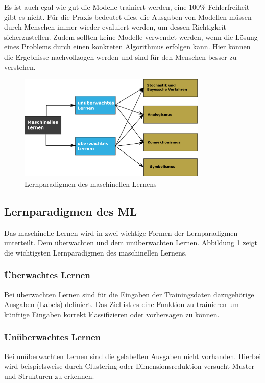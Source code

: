 Es ist auch egal wie gut die Modelle trainiert werden, eine 100\% Fehlerfreiheit gibt es nicht. Für die Praxis bedeutet dies, die Ausgaben von Modellen müssen durch Menschen immer wieder evaluiert werden, um dessen Richtigkeit sicherzustellen. Zudem sollten keine Modelle verwendet werden, wenn die Lösung eines Problems durch einen konkreten Algorithmus erfolgen kann. Hier können die Ergebnisse nachvollzogen werden und sind für den Menschen besser zu verstehen.\vspace{0.2cm}

\begin{figure}[!ht]
	\includegraphics[width=0.8\textwidth]{content/chapter_basics/images/learning_paradigmen_ml_v2.eps}
	\centering
	\caption{Lernparadigmen des maschinellen Lernens}
	\label{img:learning_paradigms_of_ml}
\end{figure}


\subsection{Lernparadigmen des ML}
Das maschinelle Lernen wird in zwei wichtige Formen der Lernparadigmen unterteilt. Dem überwachten und dem unüberwachten Lernen. Abbildung \ref{img:learning_paradigms_of_ml} zeigt die wichtigsten Lernparadigmen des maschinellen Lernens.

\subsubsection{Überwachtes Lernen}
Bei überwachten Lernen sind für die Eingaben der Trainingsdaten dazugehörige Ausgaben (Labels) definiert. Das Ziel ist es eine Funktion zu trainieren um künftige Eingaben korrekt klassifizieren oder vorhersagen zu können.

\subsubsection{Unüberwachtes Lernen}
Bei unüberwachten Lernen sind die gelabelten Ausgaben nicht vorhanden. Hierbei wird beispielsweise durch Clustering oder Dimensionsreduktion versucht Muster und Strukturen zu erkennen.


